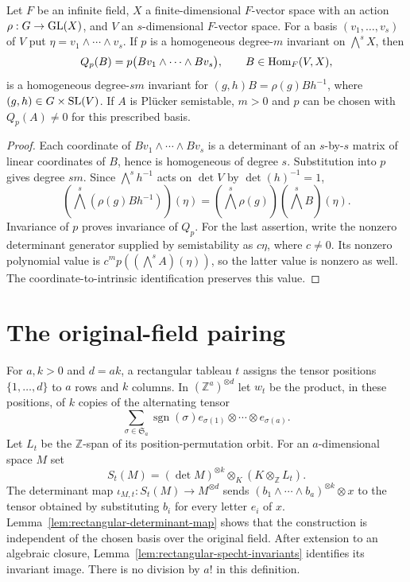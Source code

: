 \begin{lemma}
\label{lem:plucker-invariant-substitution}
\leanok
Let $F$ be an infinite field, $X$ a finite-dimensional $F$-vector space with
an action $\rho:G\to\operatorname{GL}(X)$, and $V$ an $s$-dimensional $F$-vector space.
For a basis $(v_1,\ldots,v_s)$ of $V$ put $\eta=v_1\wedge\cdots\wedge v_s$.
If $p$ is a homogeneous degree-$m$ invariant on $\bigwedge^sX$, then
\[
 Q_p(B)=p\bigl(Bv_1\wedge\cdots\wedge Bv_s\bigr),\qquad B\in\operatorname{Hom}_F(V,X),
\]
is a homogeneous degree-$sm$ invariant for
$(g,h)B=\rho(g)Bh^{-1}$, where $(g,h)\in G\times\operatorname{SL}(V)$.
If $A$ is Pl\"ucker semistable, $m>0$ and $p$ can be chosen with $Q_p(A)\ne0$
for this prescribed basis.
\end{lemma}
\begin{proof}
Each coordinate of $Bv_1\wedge\cdots\wedge Bv_s$ is a determinant of an
$s$-by-$s$ matrix of linear coordinates of $B$, hence is homogeneous of
degree $s$. Substitution into $p$ gives degree $sm$.
Since $\bigwedge^s h^{-1}$ acts on $\det V$ by $\det(h)^{-1}=1$,
\[
 (\bigwedge^s(\rho(g)Bh^{-1}))(\eta)
   =(\bigwedge^s\rho(g))(\bigwedge^s B)(\eta).
\]
Invariance of $p$ proves invariance of $Q_p$. For the last assertion, write
the nonzero determinant generator supplied by semistability as $c\eta$,
where $c\ne0$. Its nonzero polynomial value is
$c^m p((\bigwedge^s A)(\eta))$, so the latter value is nonzero as well.
The coordinate-to-intrinsic identification preserves this value.
\end{proof}

\section{The original-field pairing}

For $a,k>0$ and $d=ak$, a rectangular tableau $t$ assigns the tensor
positions $\{1,\ldots,d\}$ to $a$ rows and $k$ columns. In
$(\mathbb Z^a)^{\otimes d}$ let $w_t$ be the product, in these positions,
of $k$ copies of the alternating tensor
\[
 \sum_{\sigma\in\mathfrak S_a}\operatorname{sgn}(\sigma)
 e_{\sigma(1)}\otimes\cdots\otimes e_{\sigma(a)}.
\]
Let $L_t$ be the $\mathbb Z$-span of its position-permutation orbit.
For an $a$-dimensional space $M$ set
\[
 S_t(M)=(\det M)^{\otimes k}\otimes_K(K\otimes_{\mathbb Z}L_t).
\]
The determinant map $\iota_{M,t}:S_t(M)\to M^{\otimes d}$ sends
$(b_1\wedge\cdots\wedge b_a)^{\otimes k}\otimes x$ to the tensor obtained
by substituting $b_i$ for every letter $e_i$ of $x$.
Lemma~\ref{lem:rectangular-determinant-map} shows that the construction is
independent of the chosen basis over the original field.
After extension to an algebraic closure,
Lemma~\ref{lem:rectangular-specht-invariants} identifies its invariant image.
There is no division by $a!$ in this definition.

